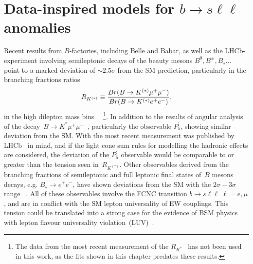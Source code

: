
\chapter{Data-inspired models for $b \to s \ell \ell$ anomalies}\label{chap:flav}
Recent results from $B$-factories, including Belle and Babar, as well as the LHCb-experiment involving semileptonic decays of the beauty mesons $B^0, B^\pm, B_s \dots$ point to a marked deviation of $ \sim 2.5 \sigma$ from the SM prediction, particularly in the branching fractions ratios
\begin{equation}
	R_{K^{(*)}} \equiv {Br(B \to K^{(*)} \mu^{+} \mu^{-}) \over Br(B \to K^{(*)} e^{+} e^{-})},
\end{equation}
in the high dilepton mass bins ~\cite{Aaij:2014ora,Aaij:2017vbb,Aaij:2019wad,Abdesselam:2019wac,LHCb:2021trn}~\footnote{The data from the most recent measurement of the $R_{K^*}$~\cite{LHCb:2021trn} has not been used in this work, as the fits shown in this chapter predates these results.}. In addition to the results of angular analysis of the decay~$B \to K^{*} \mu^{+} \mu^{-}$~\cite{Descotes-Genon:2013wba,Descotes-Genon:2015uva}, particularly the observable $P_5^\prime$,  showing similar deviation from the SM. With the most recent measurement was published by LHCb~\cite{LHCb:2020lmf} in mind, and if the light cone sum rules for modelling the hadronic effects are considered, the deviation of the $P_5^\prime$ observable would be comparable to or greater than the tension seen in~$R_{K^{(*)}}$. Other observables derived from the branching fractions of semileptonic and full leptonic final states of~$B$ mesons decays, e.g. $ B_{s} \to e^{+} e^{-}$, have shown deviations from the SM with the $2\sigma-3\sigma$ range ~\cite{Chatrchyan:2013bka,Aaij:2017vad,Aaboud:2018mst,Aaij:2020nol}. All of these observables involve
 the FCNC transition $ b \to s \ell \ell\, \, \ell = e, \mu$, and are in conflict with the SM lepton universality of EW couplings. This tension could be translated into a strong case for the evidence of BSM physics with lepton flavour universality violation~(LUV)~\cite{Hiller:2014yaa,Hiller:2014ula,Bordone:2016gaq}.\\
